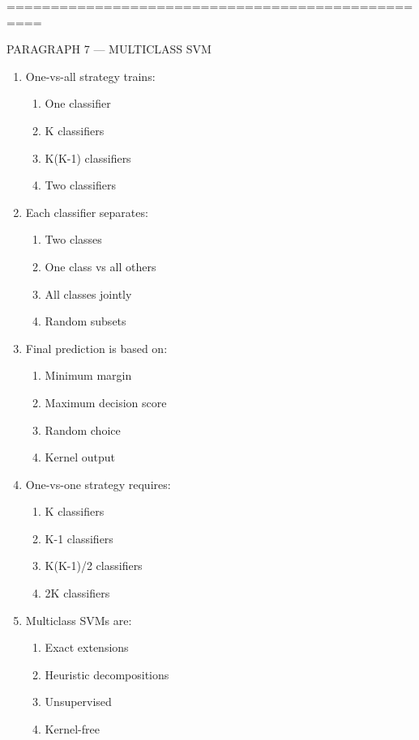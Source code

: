 \documentclass{article}
\begin{document}
	\bigskip
	==================================================
	
	PARAGRAPH 7 — MULTICLASS SVM
	
	\begin{enumerate}
		\item One-vs-all strategy trains:
		\begin{enumerate}
			\item One classifier
			\item K classifiers
			\item K(K-1) classifiers
			\item Two classifiers
		\end{enumerate}
		
		\item Each classifier separates:
		\begin{enumerate}
			\item Two classes
			\item One class vs all others
			\item All classes jointly
			\item Random subsets
		\end{enumerate}
		
		\item Final prediction is based on:
		\begin{enumerate}
			\item Minimum margin
			\item Maximum decision score
			\item Random choice
			\item Kernel output
		\end{enumerate}
		
		\item One-vs-one strategy requires:
		\begin{enumerate}
			\item K classifiers
			\item K-1 classifiers
			\item K(K-1)/2 classifiers
			\item 2K classifiers
		\end{enumerate}
		
		\item Multiclass SVMs are:
		\begin{enumerate}
			\item Exact extensions
			\item Heuristic decompositions
			\item Unsupervised
			\item Kernel-free
		\end{enumerate}
		

\end{enumerate}
\end{document}
